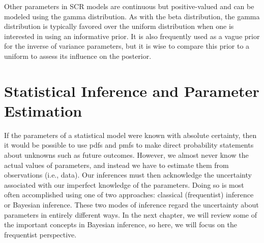 Other parameters in SCR models are continuous but
positive-valued and can be modeled using the gamma distribution. As
with the beta distribution, the gamma distribution is typically
favored over the uniform distribution when one is interested in using
an informative prior. It is also frequently used as a vague prior for
the inverse of
variance parameters, but it is wise to compare this prior to a uniform
to assess its influence on the posterior.

\section{Statistical Inference and Parameter Estimation}

If the parameters of a statistical model were known with absolute
certainty, then it would be possible to
use pdfs and pmfs to make direct
probability statements about unknowns such as future outcomes. However, we
almost never know the actual values of parameters, and instead we have
to estimate them from observations (i.e., data). Our inferences must then acknowledge the uncertainty
associated with our imperfect knowledge of the parameters. Doing so is
most often accomplished using one of two approaches:
classical (frequentist) inference or Bayesian
inference.
These two modes of inference
regard the uncertainty about parameters in
entirely different ways. In the next chapter, we will review some of
the important concepts in Bayesian inference, so here, we will
focus on the frequentist perspective.

